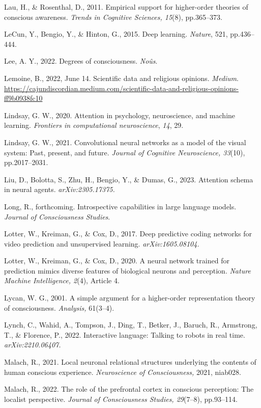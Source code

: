 \documentclass[12pt]{article}
\begin{document}
Lau, H., \& Rosenthal, D., 2011. Empirical support for higher-order
theories of conscious awareness. \emph{Trends in Cognitive Sciences,
15}(8), pp.365--373.

LeCun, Y., Bengio, Y., \& Hinton, G., 2015. Deep learning.
\emph{Nature}, 521, pp.436--444.

Lee, A. Y., 2022. Degrees of consciousness. \emph{Noûs}.

Lemoine, B., 2022, June 14. Scientific data and religious opinions.
\emph{Medium}.
\url{https://cajundiscordian.medium.com/scientific-data-and-religious-opinions-ff9b0938fc10}

Lindsay, G. W., 2020. Attention in psychology, neuroscience, and machine
learning. \emph{Frontiers in computational neuroscience}, \emph{14}, 29.

Lindsay, G. W., 2021. Convolutional neural networks as a model of the
visual system: Past, present, and future. \emph{Journal of Cognitive
Neuroscience, 33}(10), pp.2017--2031.

Liu, D., Bolotta, S., Zhu, H., Bengio, Y., \& Dumas, G., 2023. Attention
schema in neural agents. \emph{arXiv:2305.17375.}

Long, R., forthcoming. Introspective capabilities in large language models. \emph{Journal of Consciousness Studies}.

Lotter, W., Kreiman, G., \& Cox, D., 2017. Deep predictive coding
networks for video prediction and unsupervised learning.
\emph{arXiv:1605.08104.}

Lotter, W., Kreiman, G., \& Cox, D., 2020. A neural network trained for
prediction mimics diverse features of biological neurons and perception.
\emph{Nature Machine Intelligence, 2}(4), Article 4.

Lycan, W. G., 2001. A simple argument for a higher-order representation
theory of consciousness. \emph{Analysis,} 61(3--4).

Lynch, C., Wahid, A., Tompson, J., Ding, T., Betker, J., Baruch, R.,
Armstrong, T., \& Florence, P., 2022. Interactive language: Talking to
robots in real time. \emph{arXiv:2210.06407.}

Malach, R., 2021. Local neuronal relational structures underlying the
contents of human conscious experience. \emph{Neuroscience of
Consciousness,} 2021, niab028.

Malach, R., 2022. The role of the prefrontal cortex in conscious
perception: The localist perspective. \emph{Journal of Consciousness
Studies, 29}(7--8), pp.93--114.
\end{document}
